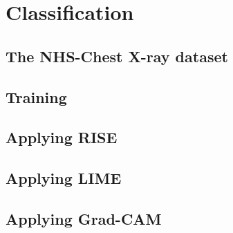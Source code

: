 \chapter{Classification}
\section{The NHS-Chest X-ray dataset}
\section{Training}
\section{Applying RISE}
\section{Applying LIME}
\section{Applying Grad-CAM}
